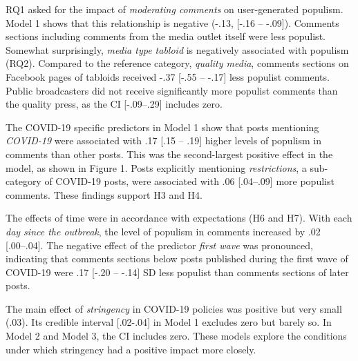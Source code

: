 \documentclass[
]{ccr}
\begin{document}
RQ1 asked for the impact of \emph{moderating comments} on user-generated
populism. Model 1 shows that this relationship is negative (-.13,
{[}-.16 -- -.09{]}). Comments sections including comments from the media
outlet itself were less populist. Somewhat surprisingly, \emph{media
type tabloid} is negatively associated with populism (RQ2). Compared to
the reference category, \emph{quality media}, comments sections on
Facebook pages of tabloids received -.37 {[}-.55 -- -.17{]} less
populist comments. Public broadcasters did not receive significantly
more populist comments than the quality press, as the CI {[}-.09--.29{]}
includes zero.

The COVID-19 specific predictors in Model 1 show that posts mentioning
\emph{COVID-19} were associated with .17 {[}.15 -- .19{]} higher levels
of populism in comments than other posts. This was the second-largest
positive effect in the model, as shown in Figure 1. Posts explicitly
mentioning \emph{restrictions}, a sub-category of COVID-19 posts, were
associated with .06 {[}.04--.09{]} more populist comments. These
findings support H3 and H4.

The effects of time were in accordance with expectations (H6 and H7).
With each \emph{day since the outbreak}, the level of populism in
comments increased by .02 {[}.00--.04{]}. The negative effect of the
predictor \emph{first wave} was pronounced, indicating that comments
sections below posts published during the first wave of COVID-19 were
.17 {[}-.20 -- -.14{]} SD less populist than comments sections of later
posts.

The main effect of \emph{stringency} in COVID-19 policies was positive
but very small (.03). Its credible interval {[}.02-.04{]} in Model 1
excludes zero but barely so. In Model 2 and Model 3, the CI includes
zero. These models explore the conditions under which stringency had a
positive impact more closely.
\end{document}
